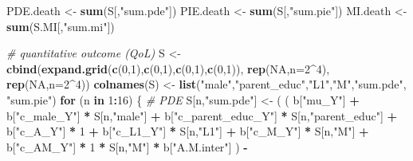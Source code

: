 \documentclass[
]{book}
\newenvironment{Shaded}{\begin{snugshade}}{\end{snugshade}}
\newcommand{\AttributeTok}[1]{\textcolor[rgb]{0.13,0.29,0.53}{#1}}
\newcommand{\CommentTok}[1]{\textcolor[rgb]{0.56,0.35,0.01}{\textit{#1}}}
\newcommand{\ConstantTok}[1]{\textcolor[rgb]{0.56,0.35,0.01}{#1}}
\newcommand{\ControlFlowTok}[1]{\textcolor[rgb]{0.13,0.29,0.53}{\textbf{#1}}}
\newcommand{\DecValTok}[1]{\textcolor[rgb]{0.00,0.00,0.81}{#1}}
\newcommand{\FunctionTok}[1]{\textcolor[rgb]{0.13,0.29,0.53}{\textbf{#1}}}
\newcommand{\NormalTok}[1]{#1}
\newcommand{\OtherTok}[1]{\textcolor[rgb]{0.56,0.35,0.01}{#1}}
\newcommand{\SpecialCharTok}[1]{\textcolor[rgb]{0.81,0.36,0.00}{\textbf{#1}}}
\newcommand{\StringTok}[1]{\textcolor[rgb]{0.31,0.60,0.02}{#1}}
\begin{document}
\begin{Shaded}
\begin{Highlighting}[]
\NormalTok{  PDE.death }\OtherTok{\textless{}{-}} \FunctionTok{sum}\NormalTok{(S[,}\StringTok{"sum.pde"}\NormalTok{])}
\NormalTok{  PIE.death }\OtherTok{\textless{}{-}} \FunctionTok{sum}\NormalTok{(S[,}\StringTok{"sum.pie"}\NormalTok{])}
\NormalTok{  MI.death }\OtherTok{\textless{}{-}} \FunctionTok{sum}\NormalTok{(S.MI[,}\StringTok{"sum.mi"}\NormalTok{])}
  
  
  \CommentTok{\# quantitative outcome (QoL)}
\NormalTok{  S }\OtherTok{\textless{}{-}} \FunctionTok{cbind}\NormalTok{(}\FunctionTok{expand.grid}\NormalTok{(}\FunctionTok{c}\NormalTok{(}\DecValTok{0}\NormalTok{,}\DecValTok{1}\NormalTok{),}\FunctionTok{c}\NormalTok{(}\DecValTok{0}\NormalTok{,}\DecValTok{1}\NormalTok{),}\FunctionTok{c}\NormalTok{(}\DecValTok{0}\NormalTok{,}\DecValTok{1}\NormalTok{),}\FunctionTok{c}\NormalTok{(}\DecValTok{0}\NormalTok{,}\DecValTok{1}\NormalTok{)), }\FunctionTok{rep}\NormalTok{(}\ConstantTok{NA}\NormalTok{,}\AttributeTok{n=}\DecValTok{2}\SpecialCharTok{\^{}}\DecValTok{4}\NormalTok{), }\FunctionTok{rep}\NormalTok{(}\ConstantTok{NA}\NormalTok{,}\AttributeTok{n=}\DecValTok{2}\SpecialCharTok{\^{}}\DecValTok{4}\NormalTok{))}
  \FunctionTok{colnames}\NormalTok{(S) }\OtherTok{\textless{}{-}} \FunctionTok{list}\NormalTok{(}\StringTok{"male"}\NormalTok{,}\StringTok{"parent\_educ"}\NormalTok{,}\StringTok{"L1"}\NormalTok{,}\StringTok{"M"}\NormalTok{,}\StringTok{"sum.pde"}\NormalTok{, }\StringTok{"sum.pie"}\NormalTok{)}
  \ControlFlowTok{for}\NormalTok{ (n }\ControlFlowTok{in} \DecValTok{1}\SpecialCharTok{:}\DecValTok{16}\NormalTok{) \{}
    \CommentTok{\# PDE }
\NormalTok{    S[n,}\StringTok{"sum.pde"}\NormalTok{] }\OtherTok{\textless{}{-}}\NormalTok{ ( ( b[}\StringTok{"mu\_Y"}\NormalTok{] }\SpecialCharTok{+} 
\NormalTok{                            b[}\StringTok{"c\_male\_Y"}\NormalTok{] }\SpecialCharTok{*}\NormalTok{ S[n,}\StringTok{"male"}\NormalTok{] }\SpecialCharTok{+} 
\NormalTok{                            b[}\StringTok{"c\_parent\_educ\_Y"}\NormalTok{] }\SpecialCharTok{*}\NormalTok{ S[n,}\StringTok{"parent\_educ"}\NormalTok{] }\SpecialCharTok{+} 
\NormalTok{                            b[}\StringTok{"c\_A\_Y"}\NormalTok{] }\SpecialCharTok{*} \DecValTok{1} \SpecialCharTok{+} 
\NormalTok{                            b[}\StringTok{"c\_L1\_Y"}\NormalTok{] }\SpecialCharTok{*}\NormalTok{ S[n,}\StringTok{"L1"}\NormalTok{] }\SpecialCharTok{+}
\NormalTok{                            b[}\StringTok{"c\_M\_Y"}\NormalTok{] }\SpecialCharTok{*}\NormalTok{ S[n,}\StringTok{"M"}\NormalTok{] }\SpecialCharTok{+}
\NormalTok{                            b[}\StringTok{"c\_AM\_Y"}\NormalTok{] }\SpecialCharTok{*} \DecValTok{1} \SpecialCharTok{*}\NormalTok{ S[n,}\StringTok{"M"}\NormalTok{] }\SpecialCharTok{*}\NormalTok{ b[}\StringTok{"A.M.inter"}\NormalTok{] ) }\SpecialCharTok{{-}} 

\end{Highlighting}
\end{Shaded}
\end{document}
